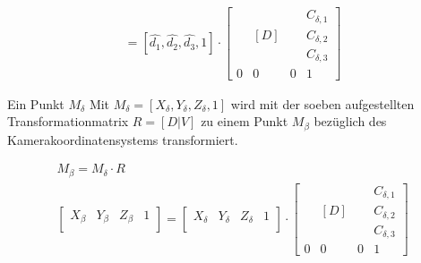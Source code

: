 



\begin{gather} 		
	[\hat{b_1}, \hat{b_2}, \hat{b_3},1]=[\hat{d_1},\hat{d_2},\hat{d_3},1] \cdot
	\begin{bmatrix}
		&  &  &C_{\delta,1} \\
		&  [D]&  &C_{\delta,2} \\ 
		&  &  &C_{\delta,3} \\
		0&0&0 & 1
	\end{bmatrix}	
\end{gather}

Ein Punkt $M_\delta$ Mit $M_\delta=[X_\delta,Y_\delta,Z_\delta,1]$ wird mit der soeben aufgestellten Transformationmatrix $R=[D|V]$ zu einem Punkt $M_\beta$ bezüglich des Kamerakoordinatensystems transformiert.

\begin{gather}
	M_\beta = M_\delta \cdot R\\
	\begin{bmatrix}
		X_\beta& Y_\beta& Z_\beta&1\\
	\end{bmatrix} = 
	\begin{bmatrix}
		X_\delta& Y_\delta& Z_\delta&1\\
	\end{bmatrix} \cdot
	\begin{bmatrix}
		&  &  &C_{\delta,1} \\
		&  [D]&  &C_{\delta,2} \\ 
		&  &  &C_{\delta,3} \\
		0&0&0 & 1
	\end{bmatrix}	
\end{gather}


